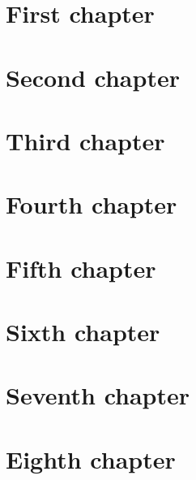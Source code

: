 \documentclass[a4paper,twoside,12pt]{book}
\begin{document}
\chapter{First chapter\label{chap:first-chapter}}


\chapter{Second chapter\label{chap:second-chapter}}


\chapter{Third chapter\label{chap:third-chapter}}


\chapter{Fourth chapter\label{chap:fourth-chapter}}


\chapter{Fifth chapter\label{chap:fifth-chapter}}


\chapter{Sixth chapter\label{chap:sixth-chapter}}


\chapter{Seventh chapter\label{chap:seventh-chapter}}


\chapter{Eighth chapter\label{chap:eighth-chapter}}

\end{document}

